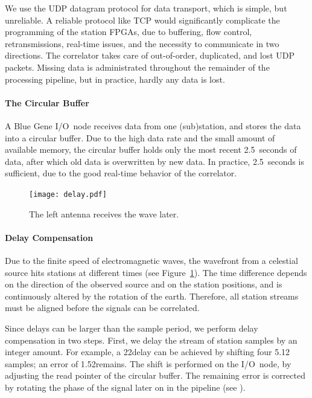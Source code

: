 We use the UDP datagram protocol for data transport, which is simple, but
unreliable.
A reliable protocol like TCP would significantly complicate the programming of
the station FPGAs, due to buffering, flow control, retransmissions, real-time
issues, and the necessity to communicate in two directions.
The correlator takes care of out-of-order, duplicated, and lost UDP packets.
Missing data is administrated throughout the remainder of the processing
pipeline, but in practice, hardly any data is lost.


\paragraph{The Circular Buffer }
A Blue Gene I/O~node receives data from one (sub)station, and stores the
data into a circular buffer.
Due to the high data rate and the small amount of available memory,
the circular buffer holds only the most recent 2.5~seconds of data, after
which old data is overwritten by new data.
In practice, 2.5~seconds is sufficient, due to the good real-time behavior of
the correlator.


\begin{figure}
\vspace{-9mm}
\begin{center}
\texttt{[image: delay.pdf]}
\end{center}
\caption{The left antenna receives the wave later.\vspace{-4mm}}
\label{fig:delay}
\end{figure}
\paragraph{Delay Compensation }
Due to the finite speed of electromagnetic waves, the wavefront from a
celestial source hits stations at different times
(see Figure~\ref{fig:delay}).
The time difference depends on the direction of the observed source and on the
station positions, and is continuously altered by the rotation of the earth.
Therefore, all station streams must be aligned before the signals can be
correlated.

Since delays can be larger than the sample period, we perform delay
compensation in two steps.
First, we delay the stream of station samples by an integer amount.
For example, a 22\us delay can be achieved by shifting four 5.12\us
samples; an error of 1.52\us remains.
The shift is performed on the I/O~node, by adjusting the read pointer of the
circular buffer.
The remaining error is corrected by rotating the phase of the signal later on
in the pipeline (see ).



